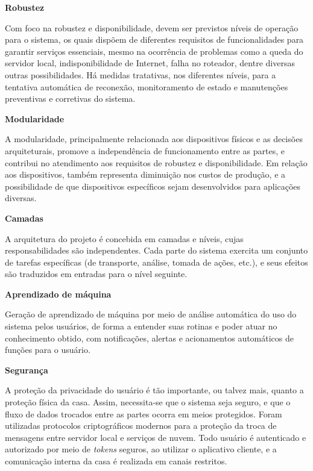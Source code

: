 \begin{description}
\item \textbf{Robustez}

Com foco na robustez e disponibilidade, devem ser previstos níveis de operação para o sistema, os quais dispõem de diferentes requisitos de funcionalidades para garantir serviços essenciais, mesmo na ocorrência de problemas como a queda do servidor local, indisponibilidade de Internet, falha no roteador, dentre diversas outras possibilidades. Há medidas tratativas, nos diferentes níveis, para a tentativa automática de reconexão, monitoramento de estado e manutenções preventivas e corretivas do sistema.

\item \textbf{Modularidade}

A modularidade, principalmente relacionada aos dispositivos físicos e as decisões arquiteturais, promove a independência de funcionamento entre as partes, e contribui no atendimento aos requisitos de robustez e disponibilidade. Em relação aos dispositivos, também representa diminuição nos custos de produção, e a possibilidade de que dispositivos específicos sejam desenvolvidos para aplicações diversas.

\item \textbf{Camadas}

A arquitetura do projeto é concebida em camadas e níveis, cujas responsabilidades são independentes. Cada parte do sistema exercita um conjunto de tarefas específicas (de transporte, análise, tomada de ações, etc.), e seus efeitos são traduzidos em entradas para o nível seguinte.

\item \textbf{Aprendizado de máquina}

Geração de aprendizado de máquina por meio de análise automática do uso do sistema pelos usuários, de forma a entender suas rotinas e poder atuar no conhecimento obtido, com notificações, alertas e acionamentos automáticos de funções para o usuário.

\item \textbf{Segurança}

A proteção da privacidade do usuário é tão importante, ou talvez mais, quanto a proteção física da casa. Assim, necessita-se que o sistema seja seguro, e que o fluxo de dados trocados entre as partes ocorra em meios protegidos. Foram utilizadas protocolos criptográficos modernos para a proteção da troca de mensagens entre servidor local e serviços de nuvem. Todo usuário é autenticado e autorizado por meio de \emph{tokens} seguros, ao utilizar o aplicativo cliente, e a comunicação interna da casa é realizada em canais restritos.

\end{description}

